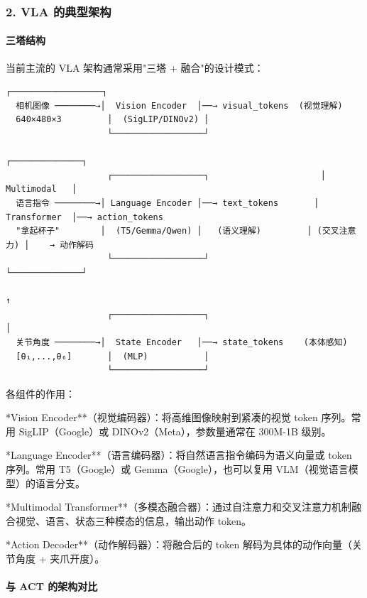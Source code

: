 \documentclass[UTF8,a4paper,11pt]{ctexart}
\begin{document}
\subsubsection{2. VLA 的典型架构}

\paragraph{三塔结构}


当前主流的 VLA 架构通常采用"三塔 + 融合"的设计模式：

\begin{lstlisting}[language=text]
                    ┌──────────────────┐
  相机图像 ────────→│  Vision Encoder  │──→ visual_tokens  (视觉理解)
  640×480×3         │  (SigLIP/DINOv2) │
                    └──────────────────┘
                                                              ┌──────────────┐
                    ┌──────────────────┐                      │ Multimodal   │
  语言指令 ────────→│ Language Encoder │──→ text_tokens       │ Transformer  │──→ action_tokens
  "拿起杯子"        │  (T5/Gemma/Qwen) │   (语义理解)         │ (交叉注意力) │    → 动作解码
                    └──────────────────┘                      └──────────────┘
                                                                      ↑
                    ┌──────────────────┐                              │
  关节角度 ────────→│  State Encoder   │──→ state_tokens    (本体感知)
  [θ₁,...,θ₆]       │  (MLP)           │
                    └──────────────────┘
\end{lstlisting}

各组件的作用：
\item **Vision Encoder**（视觉编码器）：将高维图像映射到紧凑的视觉 token 序列。常用 SigLIP（Google）或 DINOv2（Meta），参数量通常在 300M-1B 级别。
\item **Language Encoder**（语言编码器）：将自然语言指令编码为语义向量或 token 序列。常用 T5（Google）或 Gemma（Google），也可以复用 VLM（视觉语言模型）的语言分支。
\item **Multimodal Transformer**（多模态融合器）：通过自注意力和交叉注意力机制融合视觉、语言、状态三种模态的信息，输出动作 token。
\item **Action Decoder**（动作解码器）：将融合后的 token 解码为具体的动作向量（关节角度 + 夹爪开度）。

\paragraph{与 ACT 的架构对比}
\end{document}
